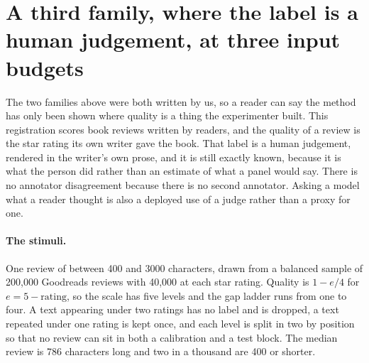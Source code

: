 
\section{A third family, where the label is a human judgement, at three input budgets}
\label{app:reviews}

The two families above were both written by us, so a reader can say the method has only been shown where quality is a thing the experimenter built. This registration scores book reviews written by readers, and the quality of a review is the star rating its own writer gave the book. That label is a human judgement, rendered in the writer's own prose, and it is still exactly known, because it is what the person did rather than an estimate of what a panel would say. There is no annotator disagreement because there is no second annotator. Asking a model what a reader thought is also a deployed use of a judge rather than a proxy for one.

\paragraph{The stimuli.}
One review of between 400 and 3000 characters, drawn from a balanced sample of 200,000 Goodreads reviews with 40,000 at each star rating. Quality is $1-e/4$ for $e=5-\text{rating}$, so the scale has five levels and the gap ladder runs from one to four. A text appearing under two ratings has no label and is dropped, a text repeated under one rating is kept once, and each level is split in two by position so that no review can sit in both a calibration and a test block. The median review is 786 characters long and two in a thousand are 400 or shorter.

